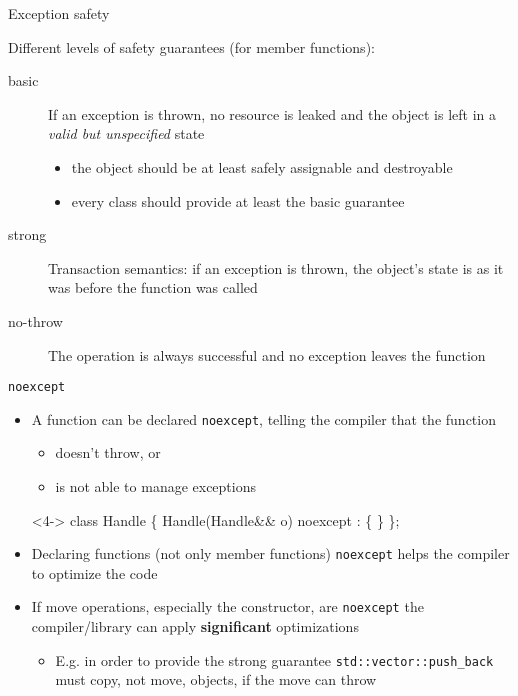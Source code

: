 \begin{frame}{Exception safety}

  Different levels of safety guarantees (for member functions):

  \begin{description}
  \item [basic] If an exception is thrown, no resource is leaked and the object
    is left in a \textit{valid but unspecified} state
    \begin{itemize}
    \item the object should be at least safely assignable and destroyable
    \item every class should provide at least the basic guarantee
    \end{itemize}
  \item [strong] Transaction semantics: if an exception is thrown, the object's
    state is as it was before the function was called
  \item [no-throw] The operation is always successful and no exception leaves
    the function
  \end{description}

\end{frame}

\begin{frame}[fragile]{\texttt{noexcept}}

  \begin{itemize}
  \item A function can be declared \texttt{noexcept}, telling the compiler that
    the function
    \begin{itemize}
    \item doesn't throw, or
    \item<2-> is not able to manage exceptions 
    \end{itemize}

    \begin{codeblock}<4->{
class Handle \{
  Handle(Handle\&\& o) \alert{noexcept} : \ddd \{ \ddd \}
  \ddd
\};}\end{codeblock}

  \item<5-> Declaring functions (not only member functions) \texttt{noexcept} helps
    the compiler to optimize the code
  \item<5-> If move operations, especially the constructor, are \texttt{noexcept} the
    compiler/library can apply \textbf{significant} optimizations
    \begin{itemize}
    \item E.g. in order to provide the strong guarantee
      \texttt{std::vector::push\_back} must copy, not move, objects, if the move
      can throw
    \end{itemize}
  \end{itemize}

\end{frame}

